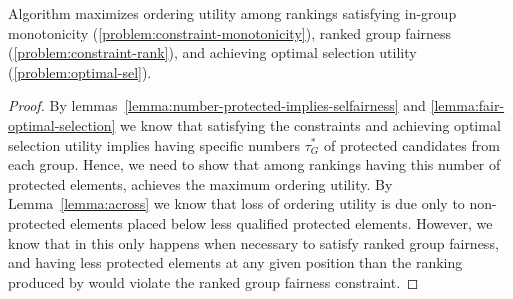 \begin{lemma}
	Algorithm \algoFAIR maximizes ordering utility among rankings satisfying in-group monotonicity (\ref{problem:constraint-monotonicity}), ranked group fairness (\ref{problem:constraint-rank}), and achieving optimal selection utility (\ref{problem:optimal-sel}).
\end{lemma}


\begin{proof}
	By lemmas~\ref{lemma:number-protected-implies-selfairness} and \ref{lemma:fair-optimal-selection} we know that satisfying the constraints and achieving optimal selection utility implies having specific numbers $\tau^*_G$ of protected candidates from each group.
	Hence, we need to show that among rankings having this number of protected elements, \algoFAIR achieves the maximum ordering utility.
	By Lemma~\ref{lemma:across} we know that loss of ordering utility is due only to non-protected elements placed below less qualified protected elements. 
	However, we know that in \algoFAIR this only happens when necessary to satisfy ranked group fairness, and having less protected elements at any given position than the ranking produced by \algoFAIR would violate the ranked group fairness constraint.
\end{proof}



